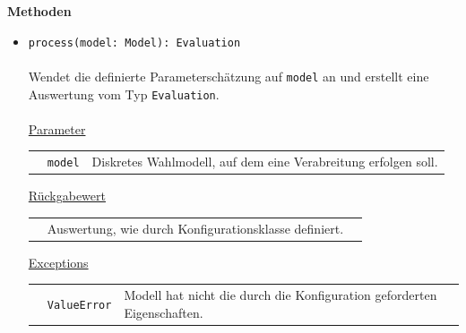 \documentclass{article}
\begin{document}
\textbf{Methoden}
\begin{itemize}\setlength\itemsep{3em}
\item \texttt{process(model: Model): Evaluation}\\\\
Wendet die definierte Parameterschätzung auf \texttt{model} an und erstellt eine Auswertung vom Typ \texttt{Evaluation}.
\\\\
\underline{Parameter}\\
\begin{tabular}{lll}
 & \texttt{model} & Diskretes Wahlmodell, auf dem eine Verabreitung erfolgen soll.\\
\end{tabular}

\underline{Rückgabewert}\\
\begin{tabular}{lll}
 & Auswertung, wie durch Konfigurationsklasse definiert.\\
\end{tabular}

\underline{Exceptions}\\
\begin{tabular}{lll}
 & \texttt{ValueError} & Modell hat nicht die durch die Konfiguration geforderten Eigenschaften.\\
\end{tabular}
\end{itemize}

\end{document}

